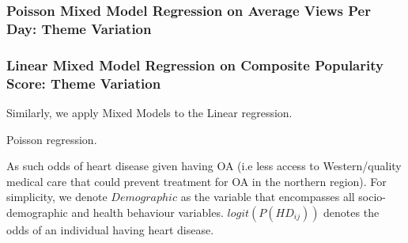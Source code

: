 \subsubsection{Poisson Mixed Model Regression on Average Views Per Day: Theme Variation}
\subsubsection{Linear Mixed Model Regression on Composite Popularity Score: Theme Variation}


Similarly, we apply Mixed Models to the Linear regression.


Poisson regression.


As such   odds of heart disease given having OA (i.e less access to Western/quality medical care that could prevent treatment for OA in the northern region). For simplicity, we denote $Demographic$ as the variable that encompasses all socio-demographic and health behaviour variables. $logit(P(HD_{ij}))$ denotes the odds of an individual having heart disease.